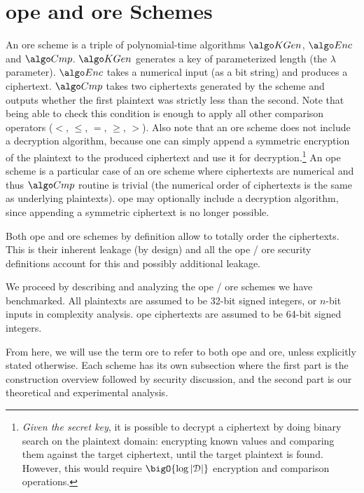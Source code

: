 \section{\acrshort{ope} and \acrshort{ore} Schemes}

	An \acrlong{ore} scheme is a triple of polynomial\hyp{}time algorithms $\setup$, $\encrypt$ and $\compare$.
	$\setup$ generates a key of parameterized length (the $\lambda$ parameter).
	$\encrypt$ takes a numerical input (as a bit string) and produces a ciphertext.
	$\compare$ takes two ciphertexts generated by the scheme and outputs whether the first plaintext was strictly less than the second.
	Note that being able to check this condition is enough to apply all other comparison operators ($<$, $\le$, $=$, $\ge$, $>$).
	Also note that an \acrshort{ore} scheme does not include a decryption algorithm, because one can simply append a symmetric encryption of the plaintext to the produced ciphertext and use it for decryption.\footnote{
		\emph{Given the secret key}, it is possible to decrypt a ciphertext by doing binary search on the plaintext domain: encrypting known values and comparing them against the target ciphertext, until the target plaintext is found.
		However, this would require $\bigO{\log{|\domain|}}$ encryption and comparison operations.
	}
	An \acrfull{ope} scheme is a particular case of an \acrshort{ore} scheme where ciphertexts are numerical and thus $\compare$ routine is trivial (the numerical order of ciphertexts is the same as underlying plaintexts).
	\acrshort{ope} may optionally include a decryption algorithm, since appending a symmetric ciphertext is no longer possible.

	Both \acrshort{ope} and \acrshort{ore} schemes by definition allow to totally order the ciphertexts.
	This is their inherent leakage (by design) and all the \acrshort{ope} / \acrshort{ore} security definitions account for this and possibly additional leakage.

	We proceed by describing and analyzing the \acrshort{ope} / \acrshort{ore} schemes we have benchmarked.
	All plaintexts are assumed to be 32-bit signed integers, or $n$-bit inputs in complexity analysis.
	\acrshort{ope} ciphertexts are assumed to be 64-bit signed integers.

	From here, we will use the term \acrshort{ore} to refer to both \acrshort{ope} and \acrshort{ore}, unless explicitly stated otherwise.
	Each scheme has its own subsection where the first part is the construction overview followed by security discussion, and the second part is our theoretical and experimental analysis.

